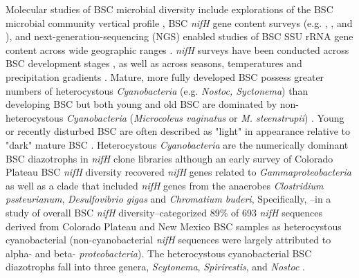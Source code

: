 Molecular studies of BSC microbial diversity include explorations of the BSC
microbial community vertical profile \citep{Garcia_Pichel_2003}, BSC
\textit{nifH} gene content surveys (e.g. \citet{14766579}, \citet{Yeager_2012},
\citet{Yeager} and \citet{Steppe_1996}), and next-generation-sequencing (NGS)
enabled studies of BSC SSU rRNA gene content across wide geographic ranges
\citep{Garcia_Pichel_2013, Steven_2013}. 
\textit{nifH} surveys have been conducted across BSC development stages
\citep{14766579}, as well as across seasons, temperatures and precipitation
gradients \citep{Yeager_2012}. Mature, more fully developed BSC possess greater
numbers of heterocystous \textit{Cyanobacteria} (e.g. \textit{Nostoc,
Syctonema}) than developing BSC but both young and old BSC are dominated by
non-heterocystous \textit{Cyanobacteria} (\textit{Microcoleus vaginatus} or
\textit{M. steenstrupii}) \citep{14766579, Garcia_Pichel_2013}. Young or
recently disturbed BSC are often described as "light" in appearance relative to
"dark" mature BSC \citep{Belnap_2002, 14766579}. Heterocystous
\textit{Cyanobacteria} are the numerically dominant BSC diazotrophs
in \textit{nifH} clone libraries \citep{Yeager, 14766579, Yeager_2012} although
an early survey of Colorado Plateau BSC \textit{nifH} diversity recovered
\textit{nifH} genes related to \textit{Gammaproteobacteria} as well as a clade
that included \textit{nifH} genes from the anaerobes \textit{Clostridium
pssteurianum}, \textit{Desulfovibrio gigas} and \textit{Chromatium buderi},
Specifically, \citet{Yeager}--in a study of overall BSC \textit{nifH}
diversity--categorized 89\% of 693 \textit{nifH} sequences derived from
Colorado Plateau and New Mexico BSC samples as heterocystous cyanobacterial
(non-cyanobacterial \textit{nifH} sequences were largely attributed to alpha-
and beta- \textit{proteobacteria}). The heterocystous cyanobacterial BSC
diazotrophs fall into three genera, \textit{Scytonema}, \textit{Spirirestis},
and \textit{Nostoc} \citep{Yeager, Yeager_2012}. 

